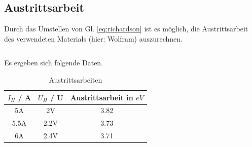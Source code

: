 \subsection{Austrittsarbeit}
\label{subsec:e}
Durch das Umstellen von Gl. \eqref{eq:richardson} ist es möglich, die Austrittsarbeit des verwendeten Materials 
(hier: Wolfram) auszurechnen. 

\begin{equation}
\label{eq:arbeit}
\end{equation}

Es ergeben sich folgende Daten.
\begin{table}
 \centering
 \caption{Austrittsarbeiten}
 \label{tab:datenaustritt}
 \begin{tabular}{|c c c|}  
 \toprule
$I_H$ / A & $U_H$ / U & Austrittsarbeit in $eV$\\
\midrule
5A & 2V & 3.82\\
5.5A & 2.2V & 3.73\\
6A & 2.4V & 3.71\\
\bottomrule
\end{tabular}
\end{table}
